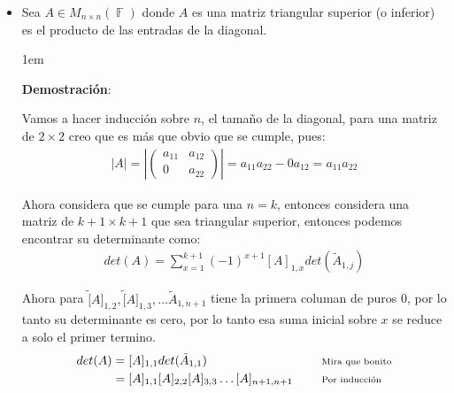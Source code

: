 \documentclass[12pt, fleqn]{report}                             %
\newenvironment{SmallIndentation}[1][0.75em]                    %
        {\begin{adjustwidth}{#1}{}\begin{footnotesize}}             %
        {\end{footnotesize}\end{adjustwidth}}                       %
\DeclareMathOperator \Space {\quad}                             %
\newcommand \Remember[1]{\Space\text{\scriptsize{#1}}}          %
\theoremstyle{break}                                            %
\DeclareMathOperator \GenericField {\mathbb{F}}                 %
\newcommand{\Mag}[1]{\left| #1 \right|}                         %
\newcommand{\pVector}[1]                                        %
        { \ensuremath{\begin{pmatrix}#1\end{pmatrix}} }             %
\begin{document}
\begin{itemize}
                    \item
                        Sea $A \in M_{n \times n}(\GenericField)$ donde $A$ es una matriz triangular
                        superior (o inferior) es el producto de las entradas de la diagonal.

                        \begin{SmallIndentation}[1em]
                            \textbf{Demostración}:
                            
                            Vamos a hacer inducción sobre $n$, el tamaño de la diagonal, para una matriz de $2 \times 2$
                            creo que es más que obvio que se cumple, pues:
                            \begin{align*}
                                |A| = \Mag{\pVector{a_{11} & a_{12} \\ 0 & a_{22}}} = a_{11}a_{22} - 0a_{12} = a_{11}a_{22}
                            \end{align*}

                            Ahora considera que se cumple para una $n = k$, entonces considera una matriz de $k+1 \times k+1$
                            que sea triangular superior, entonces podemos encontrar su determinante como:
                            \begin{align*}
                                det(A) = \sum_{x = 1}^{k+1} (-1)^{x + 1} [A]_{1, x} det(\tilde A _{1, j})     
                            \end{align*} 

                            Ahora para $\tilde [A]_{1, 2}, \tilde [A]_{1, 3}, \dots \tilde A_{1, n +1}$ tiene la primera
                            columan de puros 0, por lo tanto su determinante es cero, por lo tanto esa suma inicial sobre $x$
                            se reduce a solo el primer termino.
                            \begin{align*}
                                det(A) 
                                    &= [A]_{1, 1} det(\tilde A _{1, 1})
                                        && \Remember{Mira que bonito}                       \\
                                    &= [A]_{1, 1} [A]_{2, 2} [A]_{3, 3} \dots [A]_{n+1, n+1}
                                        && \Remember{Por inducción}
                            \end{align*}


\end{SmallIndentation}
\end{itemize}
\end{document}
